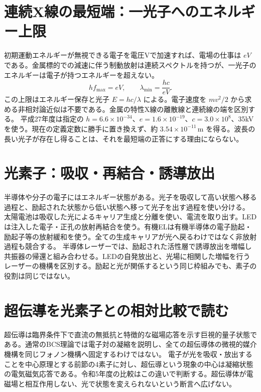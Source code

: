 \section{連続X線の最短端：一光子へのエネルギー上限}\label{theory:modern:xray}
初期運動エネルギーが無視できる電子を電圧Vで加速すれば、電場の仕事は \(eV\) である。金属標的での減速に伴う制動放射は連続スペクトルを持つが、一光子のエネルギーは電子が持つエネルギーを超えない。
\[
 hf_{\max}=eV,\qquad
 \lambda_{\min}=\frac{hc}{eV}.
\]
この上限はエネルギー保存と光子 \(E=hc/\lambda\) による。電子速度を \(mv^2/2\) から求める非相対論近似は不要である。金属の特性X線の離散線と連続線の端を区別する。
平成27年度は指定の \(h=6.6\times10^{-34}\)、\(e=1.6\times10^{-19}\)、\(c=3.0\times10^8\)、35kVを使う。現在の定義定数に勝手に置き換えず、約 \(3.54\times10^{-11}\,\mathrm m\) を得る。波長の長い光子が存在し得ることは、それを最短端の正答にする理由にならない\cite{os_photoelectric}。

\section{光素子：吸収・再結合・誘導放出}\label{theory:modern:devices}
半導体や分子の電子にはエネルギー状態がある。光子を吸収して高い状態へ移る過程と、励起された状態から低い状態へ移って光子を出す過程を使い分ける。
太陽電池は吸収した光によるキャリア生成と分離を使い、電流を取り出す。LEDは注入した電子・正孔の放射再結合を使う。有機ELは有機半導体の電子励起・励起子等の放射緩和を使う。全ての生成キャリアが光へ戻るわけではなく非放射過程も競合する\cite{modern_pv,modern_led,modern_oled}。
半導体レーザーでは、励起された活性層で誘導放出を増幅し共振器の帰還と組み合わせる。LEDの自発放出と、光場に相関した増幅を行うレーザーの機構を区別する。励起と光が関係するという同じ枠組みでも、素子の役割は同じではない\cite{modern_laser}。

\section{超伝導を光素子との相対比較で読む}\label{theory:modern:superconduct}
超伝導は臨界条件下で直流の無抵抗と特徴的な磁場応答を示す巨視的量子状態である。通常のBCS理論では電子対の凝縮を説明し、全ての超伝導体の微視的媒介機構を同じフォノン機構へ固定するわけではない。
電子が光を吸収・放出することを中心原理とする前節の4素子に対し、超伝導という現象の中心は凝縮状態の電気磁気応答である。令和5年度の比較はこの違いで判断する。超伝導体が電磁場と相互作用しない、光で状態を変えられないという断言へ広げない\cite{modern_superconduct,modern_pairs}。

